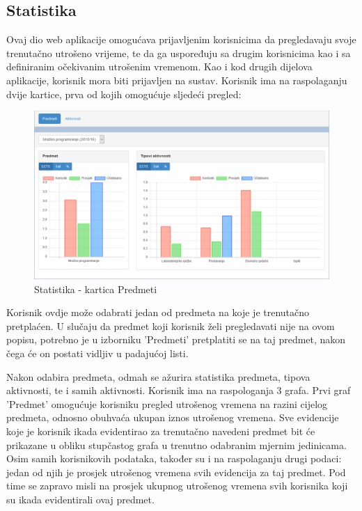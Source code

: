 \documentclass[times, utf8, zavrsni]{fer}
\begin{document}
\subsection{Statistika}
Ovaj dio web aplikacije omogućava prijavljenim korisnicima da pregledavaju svoje trenutačno utrošeno vrijeme, te da ga uspoređuju sa drugim korisnicima kao i sa definiranim očekivanim utrošenim vremenom. Kao i kod drugih dijelova aplikacije, korisnik mora biti prijavljen na sustav. Korisnik ima na raspolaganju dvije kartice, prva od kojih omogućuje sljedeći pregled:

\begin{figure}[H]
\centering
\includegraphics[width=\textwidth,height=\textheight,keepaspectratio]{img/statistika-web.png}
\caption{Statistika - kartica Predmeti}
\label{fig:statistika-web}
\end{figure}

Korisnik ovdje može odabrati jedan od predmeta na koje je trenutačno pretplaćen. U slučaju da predmet koji korisnik želi pregledavati nije na ovom popisu, potrebno je u izborniku 'Predmeti' pretplatiti se na taj predmet, nakon čega će on postati vidljiv u padajućoj listi.

Nakon odabira predmeta, odmah se ažurira statistika predmeta, tipova aktivnosti, te i samih aktivnosti. Korisnik ima na raspologanja 3 grafa. Prvi graf 'Predmet' omogućuje korisniku pregled utrošenog vremena na razini cijelog predmeta, odnosno obuhvaća ukupan iznos utrošenog vremena. Sve evidencije koje je korisnik ikada evidentirao za trenutačno navedeni predmet bit će prikazane u obliku stupčastog  grafa u trenutno odabranim mjernim jedinicama. Osim samih korisnikovih podataka, također su i na raspolaganju drugi podaci: jedan od njih je prosjek utrošenog vremena svih evidencija za taj predmet. Pod time se zapravo misli na prosjek ukupnog utrošenog vremena svih korisnika koji su ikada evidentirali ovaj predmet.
\end{document}
